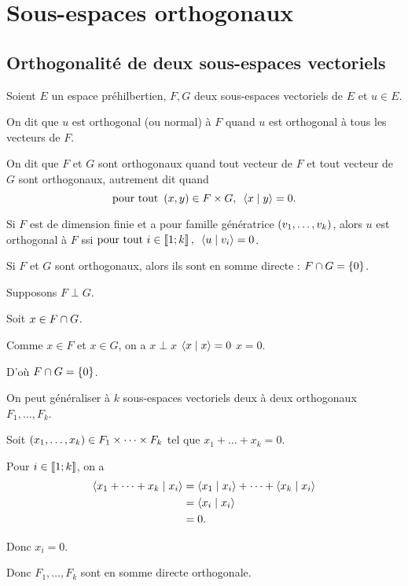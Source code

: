 \section{Sous-espaces orthogonaux}

\subsection{Orthogonalité de deux sous-espaces vectoriels}

\begin{defi}
Soient \(E\) un espace préhilbertien, \(F,G\) deux sous-espaces vectoriels de \(E\) et \(u\in E\).

On dit que \(u\) est orthogonal (ou normal) à \(F\) quand \(u\) est orthogonal à tous les vecteurs de \(F\).

On dit que \(F\) et \(G\) sont orthogonaux quand tout vecteur de \(F\) et tout vecteur de \(G\) sont orthogonaux, autrement dit quand \[\quantifs{\tpt\paren{x,y}\in F\times G}\ps{x}{y}=0.\]
\end{defi}

\begin{prop}
Si \(F\) est de dimension finie et a pour famille génératrice \(\left(v_1,\dots,v_k\right)\), alors \(u\) est orthogonal à \(F\) ssi \(\quantifs{\tpt i\in\interventierii{1}{k}}\ps{u}{v_i}=0\).
\end{prop}

\begin{prop}
Si \(F\) et \(G\) sont orthogonaux, alors ils sont en somme directe : \(F\cap G=\left\lbrace0\right\rbrace\).
\end{prop}

\begin{dem}
Supposons \(F\perp G\).

Soit \(x\in F\cap G\).

Comme \(x\in F\) et \(x\in G\), on a \(x\perp x\) \ie \(\ps{x}{x}=0\) \ie \(x=0\).

D'où \(F\cap G=\left\lbrace0\right\rbrace\).

On peut généraliser à \(k\) sous-espaces vectoriels deux à deux orthogonaux \(F_1,\dots,F_k\).

Soit \(\left(x_1,\dots,x_k\right)\in F_1\times\dots\times F_k\) tel que \(x_1+\dots+x_k=0\).

Pour \(i\in\left\llbracket1;k\right\rrbracket\), on a \[\begin{aligned}
\ps{x_1+\dots+x_k}{x_i}&=\ps{x_1}{x_i}+\dots+\ps{x_k}{x_i} \\
&=\ps{x_i}{x_i} \\
&=0.
\end{aligned}\]

Donc \(x_i=0\).

Donc \(F_1,\dots,F_k\) sont en somme directe orthogonale.
\end{dem}

